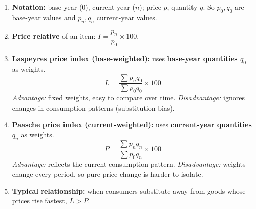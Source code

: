 \documentclass[11pt]{article}
\begin{document}
\begin{methode}
\begin{enumerate}
    \item \textbf{Notation:} base year (0), current year ($n$); price $p$, quantity $q$. So $p_0, q_0$ are base-year values and $p_n, q_n$ current-year values.
    \item \textbf{Price relative} of an item: $I = \dfrac{p_n}{p_0} \times 100$.
    \item \textbf{Laspeyres price index (base-weighted):} uses \textbf{base-year quantities $q_0$} as weights.
    \[ L = \frac{\sum p_n q_0}{\sum p_0 q_0} \times 100 \]
    \emph{Advantage:} fixed weights, easy to compare over time. \emph{Disadvantage:} ignores changes in consumption patterns (substitution bias).
    \item \textbf{Paasche price index (current-weighted):} uses \textbf{current-year quantities $q_n$} as weights.
    \[ P = \frac{\sum p_n q_n}{\sum p_0 q_n} \times 100 \]
    \emph{Advantage:} reflects the current consumption pattern. \emph{Disadvantage:} weights change every period, so pure price change is harder to isolate.
    \item \textbf{Typical relationship:} when consumers substitute away from goods whose prices rise fastest, $L > P$.
\end{enumerate}
\end{methode}
\end{document}
